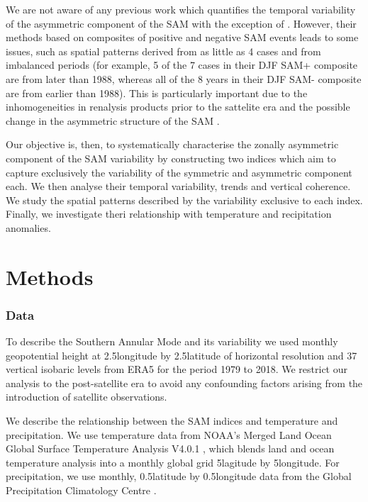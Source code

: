\documentclass[]{ametsocV5}
\begin{document}
We are not aware of any previous work which quantifies the temporal
variability of the asymmetric component of the SAM with the exception of
\citet{fogt2012}. However, their methods based on composites of positive
and negative SAM events leads to some issues, such as spatial patterns
derived from as little as 4 cases and from imbalanced periods (for
example, 5 of the 7 cases in their DJF SAM+ composite are from later
than 1988, whereas all of the 8 years in their DJF SAM- composite are
from earlier than 1988). This is particularly important due to the
inhomogeneities in renalysis products prior to the sattelite era and the
possible change in the asymmetric structure of the SAM
\citep{silvestri2009}.

Our objective is, then, to systematically characterise the zonally
asymmetric component of the SAM variability by constructing two indices
which aim to capture exclusively the variability of the symmetric and
asymmetric component each. We then analyse their temporal variability,
trends and vertical coherence. We study the spatial patterns described
by the variability exclusive to each index. Finally, we investigate
theri relationship with temperature and recipitation anomalies.

\section{Methods}

\subsubsection{Data}

To describe the Southern Annular Mode and its variability we used
monthly geopotential height at 2.5\degree longitude by
2.5\degree latitude of horizontal resolution and 37 vertical isobaric
levels from ERA5 \citep{hersbach2020} for the period 1979 to 2018. We
restrict our analysis to the post-satellite era to avoid any confounding
factors arising from the introduction of satellite observations.

We describe the relationship between the SAM indices and temperature and
precipitation. We use temperature data from NOAA's Merged Land Ocean
Global Surface Temperature Analysis V4.0.1 \citep{vose2012, smith2008},
which blends land and ocean temperature analysis into a monthly global
grid 5\degree lagitude by 5\degree longitude. For precipitation, we use
monthly, 0.5\degree latitude by 0.5\degree longitude data from the
Global Precipitation Climatology Centre \citep{schneider2015}.
\end{document}
